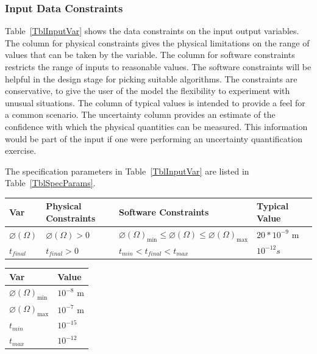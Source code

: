 \documentclass[12pt]{article}
\begin{document}
\subsubsection{Input Data Constraints} \label{sec_DataConstraints}    

Table~\ref{TblInputVar} shows the data constraints on the input output
variables.  The column for physical constraints gives the physical limitations
on the range of values that can be taken by the variable.  The column for
software constraints restricts the range of inputs to reasonable values.  The
software constraints will be helpful in the design stage for picking suitable
algorithms.  The constraints are conservative, to give the user of the model the
flexibility to experiment with unusual situations.  The column of typical values
is intended to provide a feel for a common scenario.  The uncertainty column
provides an estimate of the confidence with which the physical quantities can be
measured.  This information would be part of the input if one were performing an
uncertainty quantification exercise.

The specification parameters in Table~\ref{TblInputVar} are listed in
Table~\ref{TblSpecParams}.

\begin{table}[!h]
  \caption{Input Variables} \label{TblInputVar}
  \renewcommand{\arraystretch}{1.2}
\noindent \begin{longtable*}{l l l l c} 
  \toprule
  \textbf{Var} & \textbf{Physical Constraints} & \textbf{Software Constraints} &
                             \textbf{Typical Value} \\
  \midrule 
  $\varnothing(\Omega)$ & $\varnothing(\Omega) > 0$ & $\varnothing(\Omega)_{\text{min}} \leq \varnothing(\Omega) \leq \varnothing(\Omega)_{\text{max}}$ & $20*10^{-9}$ \si[per-mode=symbol] {\metre} 
  \\
  $t_{final}$ & $t_{final}>0$ &   $t_{min} < t_{final} < t_{max}$ & $10^{-12} s$\\
  \bottomrule
\end{longtable*}
\end{table}

\begin{table}[!h]
\caption{Specification Parameter Values} \label{TblSpecParams}
\renewcommand{\arraystretch}{1.2}
\noindent \begin{longtable*}{l l} 
  \toprule
  \textbf{Var} & \textbf{Value} \\
  \midrule 
  $\varnothing(\Omega)_{\text{min}}$ & $10^{-8}$ \si{\metre}\\
  $\varnothing(\Omega)_{\text{max}}$ & $10^{-7}$ \si{\metre}\\
  $t_{min}$ & $10^{-15}$\\
  $t_{max}$ & $10^{-12}$\\
  
  
  \bottomrule
\end{longtable*}
\end{table}
\end{document}
